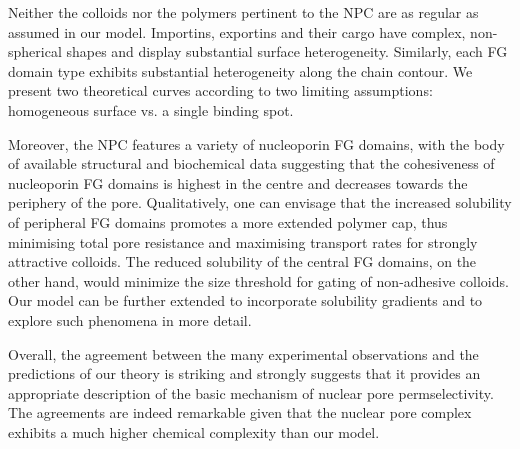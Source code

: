 \documentclass[12pt, a4paper]{article}
\begin{document}
Neither the colloids nor the polymers pertinent to the NPC are as regular as assumed in our model.
Importins, exportins and their cargo have complex, non-spherical shapes and display substantial surface heterogeneity.
Similarly, each FG domain type exhibits substantial heterogeneity along the chain contour.
We present two theoretical curves according to two limiting assumptions: homogeneous surface vs. a single binding spot.

Moreover, the NPC features a variety of nucleoporin FG domains, with the body of available structural and biochemical data suggesting that the cohesiveness of nucleoporin FG domains is highest in the centre and decreases towards the periphery of the pore.
Qualitatively, one can envisage that the increased solubility of peripheral FG domains promotes a more extended polymer cap, thus minimising total pore resistance and maximising transport rates for strongly attractive colloids.
The reduced solubility of the central FG domains, on the other hand, would minimize the size threshold for gating of non-adhesive colloids.
Our model can be further extended to incorporate  solubility gradients and to explore such phenomena in more detail.

Overall, the agreement between the many experimental observations and the predictions of our theory is striking and strongly suggests that it provides an appropriate description of the basic mechanism of nuclear pore permselectivity.
The agreements are indeed remarkable given that the nuclear pore complex exhibits a much higher chemical complexity than our model.



\printbibliography
\end{document}
